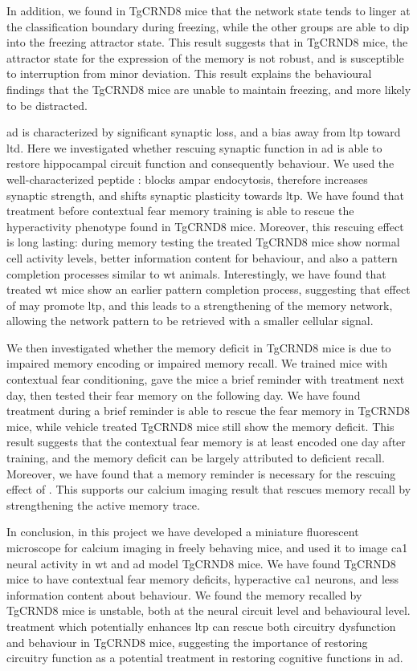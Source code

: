 In addition, we found in TgCRND8 mice that the network state tends to linger at the classification boundary during freezing, while the other groups are able to dip into the freezing attractor state. This result suggests that in TgCRND8 mice, the attractor state for the expression of the memory is not robust, and is susceptible to interruption from minor deviation. This result explains the behavioural findings that the TgCRND8 mice are unable to maintain freezing, and more likely to be distracted. 

\Gls{ad} is characterized by significant synaptic loss, and a bias away from \gls{ltp} toward \gls{ltd}. Here we investigated whether rescuing synaptic function in \gls{ad} is able to restore hippocampal circuit function and consequently behaviour. We used the well-characterized peptide \tglu{}: \tglu{} blocks \gls{ampar} endocytosis, therefore increases synaptic strength, and shifts synaptic plasticity towards \gls{ltp}. We have found that \tglu{} treatment before contextual fear memory training is able to rescue the hyperactivity phenotype found in TgCRND8 mice. Moreover, this rescuing effect is long lasting: during memory testing the treated TgCRND8 mice show normal cell activity levels, better information content for behaviour, and also a pattern completion processes similar to \gls{wt} animals. Interestingly, we have found that \tglu{} treated \gls{wt} mice show an earlier pattern completion process, suggesting that effect of \tglu{} may promote \gls{ltp}, and this leads to a strengthening of the memory network, allowing the network pattern to be retrieved with a smaller cellular signal. 

We then investigated whether the memory deficit in TgCRND8 mice is due to impaired memory encoding or impaired memory recall. We trained mice with contextual fear conditioning, gave the mice a brief reminder with \tglu{} treatment next day, then tested their fear memory on the following day. We have found \tglu{} treatment during a brief reminder is able to rescue the fear memory in TgCRND8 mice, while vehicle treated TgCRND8 mice still show the memory deficit. This result suggests that the contextual fear memory is at least encoded one day after training, and the memory deficit can be largely attributed to deficient recall. Moreover, we have found that a memory reminder is necessary for the rescuing effect of \tglu{}. This supports our calcium imaging result that \tglu{} rescues memory recall by strengthening the active memory trace. 

In conclusion, in this project we have developed a miniature fluorescent microscope for calcium imaging in freely behaving mice, and used it to image \gls{ca1} neural activity in \gls{wt} and \gls{ad} model TgCRND8 mice. We have found TgCRND8 mice to have contextual fear memory deficits, hyperactive \gls{ca1} neurons, and less information content about behaviour. We found the memory recalled by TgCRND8 mice is unstable, both at the neural circuit level and behavioural level. \tglu{} treatment which potentially enhances \gls{ltp} can rescue both circuitry dysfunction and behaviour in TgCRND8 mice, suggesting the importance of restoring circuitry function as a potential treatment in restoring cognitive functions in \gls{ad}.

